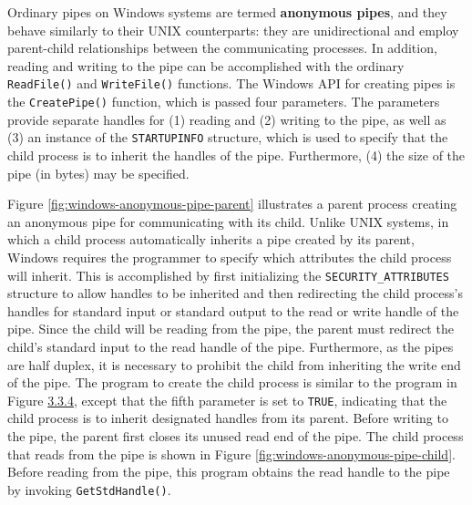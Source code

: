 Ordinary pipes on Windows systems are termed \textbf{anonymous pipes}, and they behave similarly to their UNIX counterparts: they are unidirectional and employ parent-child relationships between the communicating processes. In addition, reading and writing to the pipe can be accomplished with the ordinary \texttt{ReadFile()} and \texttt{WriteFile()} functions. The Windows API for creating pipes is the \texttt{CreatePipe()} function, which is passed four parameters. The parameters provide separate handles for (1) reading and (2) writing to the pipe, as well as (3) an instance of the \texttt{STARTUPINFO} structure, which is used to specify that the child process is to inherit the handles of the pipe. Furthermore, (4) the size of the pipe (in bytes) may be specified.

Figure \ref{fig:windows-anonymous-pipe-parent} illustrates a parent process creating an anonymous pipe for communicating with its child. Unlike UNIX systems, in which a child process automatically inherits a pipe created by its parent, Windows requires the programmer to specify which attributes the child process will inherit. This is accomplished by first initializing the \texttt{SECURITY\_ATTRIBUTES} structure to allow handles to be inherited and then redirecting the child process's handles for standard input or standard output to the read or write handle of the pipe. Since the child will be reading from the pipe, the parent must redirect the child's standard input to the read handle of the pipe. Furthermore, as the pipes are half duplex, it is necessary to prohibit the child from inheriting the write end of the pipe. The program to create the child process is similar to the program in Figure \hyperref[fig:process-creation-windows]{3.3.4}, except that the fifth parameter is set to \texttt{TRUE}, indicating that the child process is to inherit designated handles from its parent. Before writing to the pipe, the parent first closes its unused read end of the pipe. The child process that reads from the pipe is shown in Figure \ref{fig:windows-anonymous-pipe-child}. Before reading from the pipe, this program obtains the read handle to the pipe by invoking \texttt{GetStdHandle()}.

